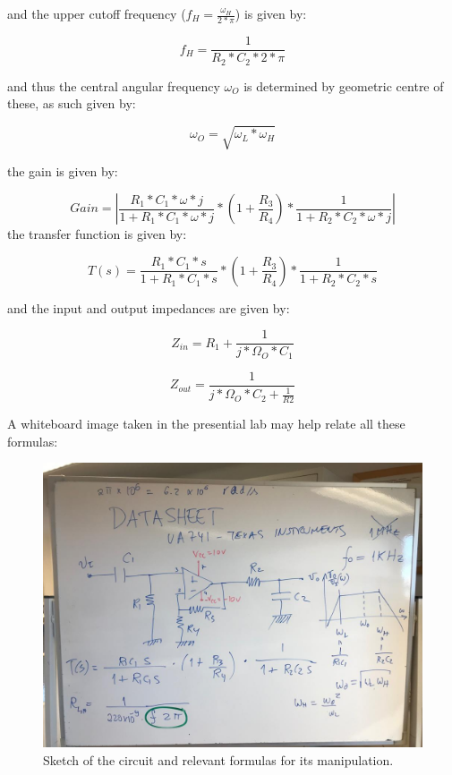 and the upper cutoff frequency ($f_H = \frac{\omega_H}{2*\pi}$) is given by: 

\begin {equation}
	f_H = \frac{1}{R_2 *C_2* 2*\pi}  
	\label{eq:ucf}
\end{equation}

and thus the central angular frequency $\omega_O$ is determined by geometric centre of these, as such given by:

\begin {equation}
	\omega_O= \sqrt{\omega_L * \omega_H }  
	\label{eq:CentralF}
\end{equation}
 
the gain is given by:

\begin {equation}
	Gain= |\frac{R_1*C_1*\omega*j}{1+R_1*C_1*\omega*j}*(1+\frac{R_3}{R_4})*\frac{1}{1+R_2*C_2*\omega*j}|   	
	\label{eq:gain}
\end{equation} 
the transfer function is given by: 

\begin {equation}
	T(s) = \frac{R_1*C_1*s}{1+R_1*C_1*s}*(1+\frac{R_3}{R_4})*\frac{1}{1+R_2*C_2*s}   	
	\label{eq:gain}
\end{equation} 

and the input and output impedances are given by: 

\begin {equation}
	Z_{in} = R_1 + \frac{1}{j*\Omega_O*C_1} 
	\label{eq:impedances_in}
\end{equation}  

\begin {equation}
       Z_{out} = \frac{1}{j*\Omega_O*C_2+\frac{1}{R2}}	
	\label{eq:impedances_out}
\end{equation}  

A whiteboard image taken in the presential lab may help relate all these formulas:

\begin{figure}[h] \centering
\includegraphics[width=0.95\linewidth]{datasheet.jpeg}
\caption{Sketch of the circuit and relevant formulas for its manipulation.}
\label{fig:formulas}
\end{figure}



